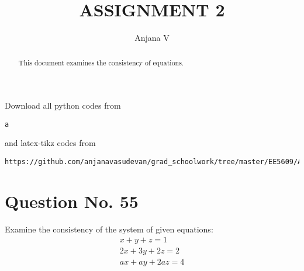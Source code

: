 \documentclass[journal,12pt,twocolumn]{IEEEtran}
\title{ASSIGNMENT 2}
\author{Anjana V }
\begin{document}
\makeatletter
\renewcommand*\env@matrix[1][*\c@MaxMatrixCols c]{%
  \hskip -\arraycolsep
  \let\@ifnextchar\new@ifnextchar
  \array{#1}}
\makeatother
\newcommand{\myvec}[1]{\ensuremath{\begin{pmatrix}#1\end{pmatrix}}}
\newcommand{\BAR}{%
  \hspace{-\arraycolsep}%
  \strut\vrule %
  \hspace{-\arraycolsep}%
}
\renewcommand{\vec}[1]{\mathbf{#1}}
\maketitle
\begin{abstract}
This document examines the consistency of equations.
\end{abstract}
Download all python codes from 
%
\begin{lstlisting}
a
\end{lstlisting}
%
and latex-tikz codes from 
%
\begin{lstlisting}
https://github.com/anjanavasudevan/grad_schoolwork/tree/master/EE5609/Assignment2/latex
\end{lstlisting}
%
\section{Question No. 55}
Examine the consistency of the system of given equations:
\begin{align}
		x+y+z =1 
		\\2x+3y+2z = 2
		\\ax+ay+2az = 4
\end{align}
\end{document}
